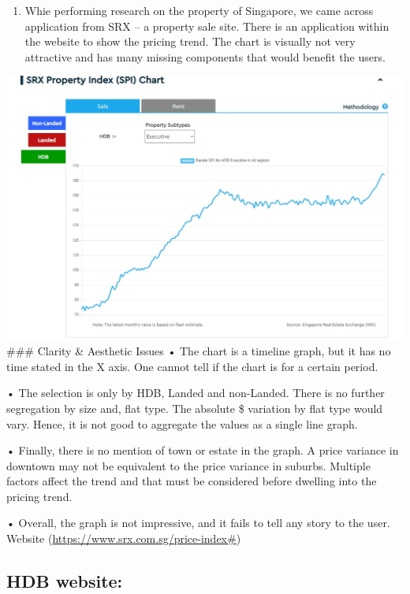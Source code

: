 \documentclass{acm_proc_article-sp}
\providecommand{\tightlist}{%
  \setlength{\itemsep}{0pt}\setlength{\parskip}{0pt}}
\begin{document}
\begin{enumerate}
\def\labelenumi{\arabic{enumi}.}
\tightlist
\item
  Whie performing research on the property of Singapore, we came across
  application from SRX -- a property sale site. There is an application
  within the website to show the pricing trend. The chart is visually
  not very attractive and has many missing components that would benefit
  the users.
\end{enumerate}

\includegraphics{IMG/img1.jpg} \#\#\# Clarity \& Aesthetic Issues • The
chart is a timeline graph, but it has no time stated in the X axis. One
cannot tell if the chart is for a certain period.

• The selection is only by HDB, Landed and non-Landed. There is no
further segregation by size and, flat type. The absolute \$ variation by
flat type would vary. Hence, it is not good to aggregate the values as a
single line graph.

• Finally, there is no mention of town or estate in the graph. A price
variance in downtown may not be equivalent to the price variance in
suburbs. Multiple factors affect the trend and that must be considered
before dwelling into the pricing trend.

• Overall, the graph is not impressive, and it fails to tell any story
to the user. Website (\url{https://www.srx.com.sg/price-index\#})

\hypertarget{hdb-website}{%
\subsection{HDB website:}\label{hdb-website}}
\end{document}

